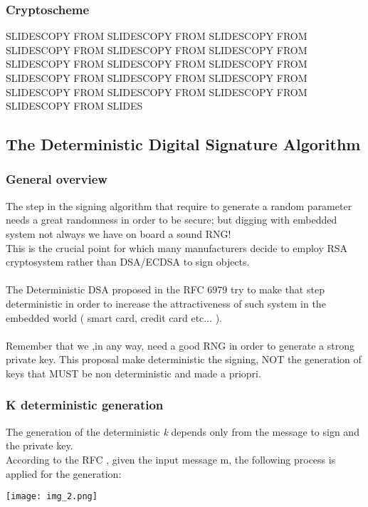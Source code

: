 \documentclass[11pt,english]{article}
\begin{document}
\subsubsection{Cryptoscheme}

SLIDESCOPY FROM SLIDESCOPY FROM SLIDESCOPY FROM SLIDESCOPY FROM SLIDESCOPY FROM SLIDESCOPY FROM SLIDESCOPY FROM SLIDESCOPY FROM SLIDESCOPY FROM SLIDESCOPY FROM SLIDESCOPY FROM SLIDESCOPY FROM SLIDESCOPY FROM SLIDESCOPY FROM SLIDESCOPY FROM SLIDESCOPY FROM SLIDES

\subsection{The Deterministic Digital Signature Algorithm}

\subsubsection{General overview}
The step in the signing algorithm that require to generate a random parameter needs a great randomness in order to be secure; but digging with embedded system not always we have on board a sound RNG! \\This is the crucial point for which many manufacturers decide to employ RSA cryptosystem rather than DSA/ECDSA to sign objects.\\
\\The Deterministic DSA proposed in the RFC 6979 try to make that step deterministic in order to increase the attractiveness of such system in the embedded world ( smart card, credit card etc... ).\\\\
Remember that we ,in any way, need a good RNG in order to generate a strong private key. 
This proposal make deterministic the signing, NOT the generation of keys that MUST be non deterministic and made a priopri.


\subsubsection{K deterministic generation}

The generation of the deterministic \textit{k} depends only from the message to sign and the private key.\\
According to the RFC ,  given the input message m, the following process is applied for the generation:

\texttt{[image: img\_2.png]} \\
\end{document}
